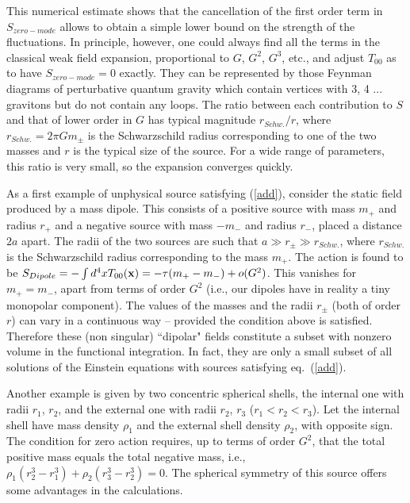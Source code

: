 \documentclass[a4paper,11pt]{article}
\begin{document}
This numerical estimate shows that the cancellation of the first 
order term in $S_{zero-mode}$ allows to obtain a simple
lower bound on the strength of the fluctuations.
In principle, however, one could always find all the terms
in the classical weak field expansion, proportional to
$G$, $G^2$, $G^3$, etc., and adjust $T_{00}$ as to have 
$S_{zero-mode} =0$ exactly. They can be represented by
those Feynman diagrams of perturbative quantum gravity
which contain vertices with 3, 4 ... gravitons but do not 
contain any loops. 
The ratio between each contribution to $S$ and that of
lower order in $G$ has typical magnitude
$r_{Schw.}/r$,
where $r_{Schw.}=2\pi G m_\pm$ is the Schwarzschild radius
corresponding to one of the two masses and $r$       
is the typical size of the source. For a wide range of
parameters, this ratio is very small, so the expansion
converges quickly. 

As a first example of unphysical source satisfying 
(\ref{add}), consider the static field produced 
by a mass dipole. This consists of a positive source 
with mass 
$m_{+}$ and radius $r_{+}$ and a negative source with 
mass $-m_{-}$ and radius $r_{-}$, placed a distance 
$2a$ apart. The radii of the 
two sources are such that $a \gg r_\pm \gg r_{Schw.}$, 
where $r_{Schw.}$ is the Schwarzschild radius corresponding 
to the mass $m_{+}$. 
The action is found to be
$S_{Dipole} = - \int d^4x T_{00}({\bf x}) =
-\tau (m_+ - m_-) + o(G^2)$.
This vanishes for $m_+ = m_-$,
apart from terms of order $G^2$ (i.e., our dipoles have 
in reality a tiny monopolar component). The values of 
the masses and the radii $r_\pm$ (both of order $r$) can 
vary in a continuous way -- provided the condition above
is satisfied. Therefore these (non singular) ``dipolar" 
fields constitute a subset with nonzero volume 
in the functional integration. In fact, they are only 
a small subset of all solutions of the Einstein equations
with sources satisfying eq.\ (\ref{add}).

Another example is given by 
two concentric spherical shells, the internal
one with radii $r_1$, $r_2$, and the external one with
radii $r_2$, $r_3$ ($r_1 < r_2 < r_3$). Let the internal
shell have mass density $\rho_1$ and the external shell
density $\rho_2$, with opposite sign. 
The condition for zero action requires,
up to terms of order $G^2$, that the total positive mass
equals the total negative mass, i.e.,
$\rho_1 (r_2^3 - r_1^3) + \rho_2 (r_3^3 - r_2^3) = 0$.
The spherical symmetry of this source
offers some advantages in the calculations.
\end{document}
